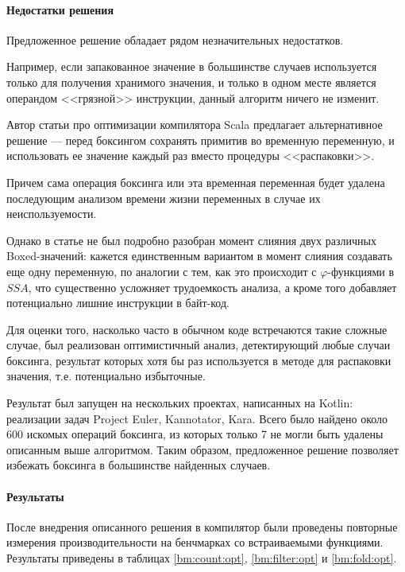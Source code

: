 \paragraph{Недостатки решения}
Предложенное решение обладает рядом незначительных недостатков.

Например, если запакованное значение в большинстве случаев используется только для получения
хранимого значения, и только в одном месте является операндом <<грязной>> инструкции, данный
алгоритм ничего не изменит.

Автор статьи про оптимизации компилятора Scala\cite{ScalaDragos} предлагает альтернативное
решение --- перед боксингом сохранять примитив во временную переменную, и использовать ее
значение каждый раз вместо процедуры <<распаковки>>.

Причем сама операция боксинга или эта временная переменная будет удалена последующим анализом
времени жизни переменных в случае их неиспользуемости.

Однако в статье не был подробно разобран момент слияния двух различных Boxed-значений:
кажется единственным вариантом в момент слияния создавать еще одну переменную, по аналогии с тем,
как это происходит с $\varphi$-функциями в $SSA$\cite{Muchnick}, что существенно усложняет
трудоемкость анализа, а кроме того добавляет потенциально лишние инструкции в байт-код.

Для оценки того, насколько часто в обычном коде встречаются такие сложные случае, был реализован
оптимистичный анализ, детектирующий любые случаи боксинга, результат которых хотя бы раз
используется в методе для распаковки значения, т.е. потенциально избыточные.

Результат был запущен на нескольких проектах, написанных на Kotlin: реализации задач Project Euler,
Kannotator, Kara.
Всего было найдено около 600 искомых операций боксинга, из которых только 7 не могли быть удалены
описанным выше алгоритмом.
Таким образом, предложенное решение позволяет избежать боксинга в большинстве найденных случаев.

\paragraph{Результаты}
После внедрения описанного решения в компилятор были проведены повторные измерения
производительности на бенчмарках со встраиваемыми функциями. Результаты приведены в таблицах
\ref{bm:count:opt}, \ref{bm:filter:opt} и \ref{bm:fold:opt}.

